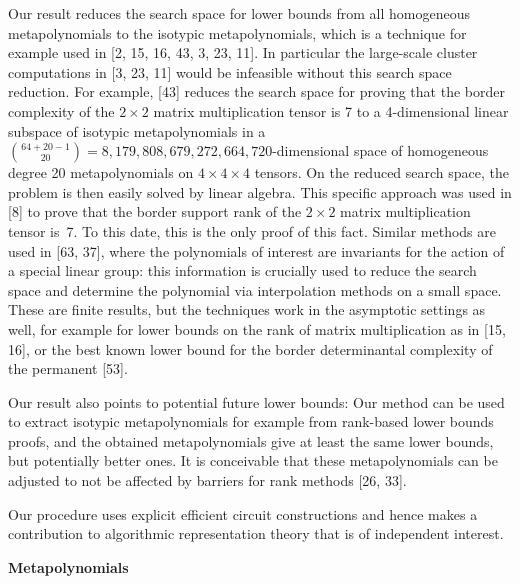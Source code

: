 Our result reduces the search space for lower bounds from all homogeneous metapolynomials to the isotypic metapolynomials, which is a technique for example used in
[2, 15, 16, 43, 3, 23, 11]. In particular the large-scale cluster computations in [3, 23, 11] would be infeasible without this search space reduction. For example, [43] reduces the search space for proving that the border complexity of the $2\times 2$ matrix multiplication tensor is 7 to a 4-dimensional linear subspace of isotypic metapolynomials in a $\binom{64+20-1}{20}=8,179,808,679,272,664,720$-dimensional space of homogeneous degree 20 metapolynomials on $4\times 4\times 4$ tensors. On the reduced search space, the problem is then easily solved by linear algebra.
This specific approach was used in [8] to prove that the border support rank of the $2\times 2$ matrix multiplication tensor is 7. To this date, this is the only proof of this fact.
Similar methods are used in [63, 37], where the polynomials of interest are invariants for the action of a special linear group: this information is crucially used to reduce the search space and determine the polynomial via interpolation methods on a small space.
These are finite results, but the techniques work in the asymptotic settings as well, for example for lower bounds on the rank of matrix multiplication as in [15, 16], or the
best known lower bound for the border determinantal complexity of the permanent
[53].





Our result also points to potential future lower bounds:
Our method can be used to extract isotypic metapolynomials for example from rank-based lower bounds proofs, and the obtained metapolynomials give at least the same lower bounds, but potentially better ones.
It is conceivable that these metapolynomials can be adjusted to not be affected by barriers for rank methods [26, 33].





Our procedure uses explicit efficient circuit constructions and hence makes a contribution to algorithmic representation theory that is of independent interest.





\par\medskip\noindent\textbf{Metapolynomials}\par




